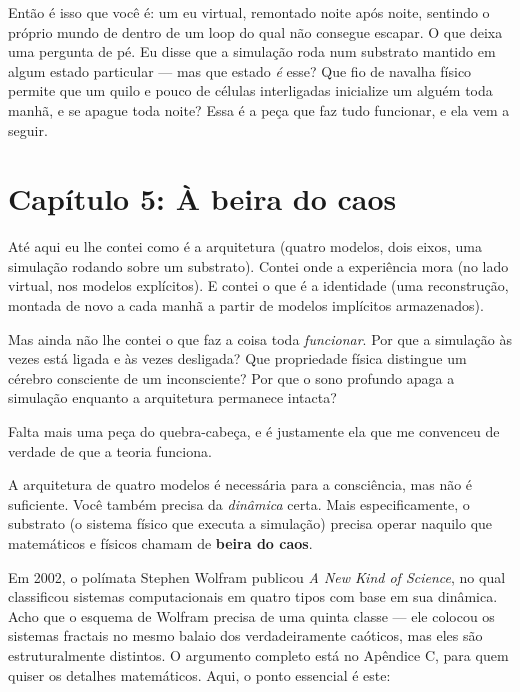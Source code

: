 \documentclass[11pt, twoside, openright]{book}
\begin{document}
Então é isso que você é: um eu virtual, remontado noite após noite, sentindo o próprio mundo de dentro de um loop do qual não consegue escapar. O que deixa uma pergunta de pé. Eu disse que a simulação roda num substrato mantido em algum estado particular --- mas que estado \textit{é} esse? Que fio de navalha físico permite que um quilo e pouco de células interligadas inicialize um alguém toda manhã, e se apague toda noite? Essa é a peça que faz tudo funcionar, e ela vem a seguir.


\chapter*{Capítulo 5: À beira do caos}

Até aqui eu lhe contei como é a arquitetura (quatro modelos, dois eixos, uma simulação rodando sobre um substrato). Contei onde a experiência mora (no lado virtual, nos modelos explícitos). E contei o que é a identidade (uma reconstrução, montada de novo a cada manhã a partir de modelos implícitos armazenados).

Mas ainda não lhe contei o que faz a coisa toda \textit{funcionar}. Por que a simulação às vezes está ligada e às vezes desligada? Que propriedade física distingue um cérebro consciente de um inconsciente? Por que o sono profundo apaga a simulação enquanto a arquitetura permanece intacta?

Falta mais uma peça do quebra-cabeça, e é justamente ela que me convenceu de verdade de que a teoria funciona.

A arquitetura de quatro modelos é necessária para a consciência, mas não é suficiente. Você também precisa da \textit{dinâmica} certa. Mais especificamente, o substrato (o sistema físico que executa a simulação) precisa operar naquilo que matemáticos e físicos chamam de \textbf{beira do caos}.

Em 2002, o polímata Stephen Wolfram publicou \textit{A New Kind of Science}, no qual classificou sistemas computacionais em quatro tipos com base em sua dinâmica. Acho que o esquema de Wolfram precisa de uma quinta classe --- ele colocou os sistemas fractais no mesmo balaio dos verdadeiramente caóticos, mas eles são estruturalmente distintos. O argumento completo está no Apêndice C, para quem quiser os detalhes matemáticos. Aqui, o ponto essencial é este:
\end{document}

